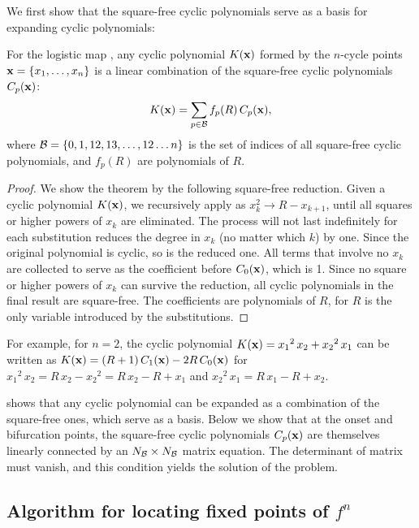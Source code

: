 \documentclass[preprint]{revtex4-1}
\begin{document}
We first show that
  the square-free cyclic polynomials
  serve as a basis for expanding cyclic polynomials:



\begin{theorem}
  For the logistic map ,
  any cyclic polynomial $K(\mathbf{x})$
  formed by the $n$-cycle points
  $\mathbf{x} = \{x_1, \ldots, x_n\}$
  is a linear combination of
the square-free cyclic polynomials $C_p(\mathbf{x})$:
\[
  K(\mathbf{x}) = \sum_{p \in \mathcal B} f_p(R) \, C_p(\mathbf{x}),
\]
  where $\mathcal B = \{0, 1, 12, 13, \ldots, 12\dots n\}$ is
  the set of indices of all square-free cyclic polynomials,
  and $f_p(R)$ are polynomials of $R$.
  \label{thm:sqrfree}
\end{theorem}


\begin{proof}
We show the theorem by the following square-free reduction.
%
Given a cyclic polynomial $K(\mathbf{x})$,
  we recursively apply  as
  $x_k^2 \rightarrow R - x_{k+1}$,
  until all squares or higher powers of $x_k$ are eliminated.
The process will not last indefinitely
  for each substitution reduces the degree in $x_k$ (no matter which $k$)
  by one.
Since the original polynomial is cyclic,
  so is the reduced one.
All terms that involve no $x_k$
  are collected to serve as the coefficient before $C_0(\mathbf{x})$, which is 1.
Since no square or higher powers of $x_k$
  can survive the reduction,
  all cyclic polynomials in the final result
  are square-free.
The coefficients are polynomials of $R$,
  for $R$ is the only variable introduced by the substitutions.
\end{proof}


For example, for $n = 2$, the cyclic polynomial
  $K(\mathbf{x}) = {x_1}^2 \, x_2 + {x_2}^2 \, x_1$
can be written as $K(\mathbf{x}) = (R + 1) \, C_{1}(\mathbf{x}) - 2 R \, C_0(\mathbf{x})$
for
${x_1}^2 \, x_2 = R \, x_2 - {x_2}^2 = R \, x_2 - R + x_1$ and
${x_2}^2 \, x_1 = R \, x_1 - R + x_2$.


  shows that any cyclic polynomial
  can be expanded
  as a combination of the square-free ones,
  which serve as a basis.
Below we show that at the onset and bifurcation points,
  the square-free cyclic polynomials $C_p(\mathbf{x})$ are themselves
  linearly connected by an $N_\mathcal B \times N_\mathcal B$ matrix equation.
The determinant of matrix must vanish,
  and this condition yields the solution of the problem.


\subsection{\label{sec:algo}Algorithm for locating fixed points of $f^n$}
\end{document}

